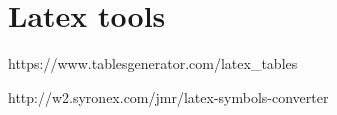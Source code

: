\documentclass{extarticle}
\begin{document}
\section{Latex tools}

https://www.tablesgenerator.com/latex\_tables

http://w2.syronex.com/jmr/latex-symbols-converter




\iftoggle{editing}{%
}{%
  \end{multicols}
}
\end{document}
